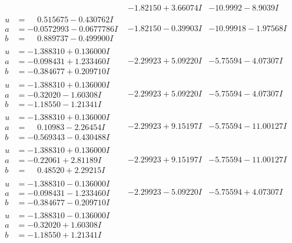 \documentclass[1p]{elsarticle_modified}
\theoremstyle{definition}
\begin{document}
$$\begin{array}{c|c|c}
 & -1.82150 + 3.66074 I & -10.9992 - 8.9039 I \\ \hline\begin{aligned}
u &= \phantom{-}0.515675 - 0.430762 I \\
a &= -0.0572993 - 0.0677786 I \\
b &= \phantom{-}0.889737 - 0.499900 I\end{aligned}
 & -1.82150 - 0.39903 I & -10.99918 - 1.97568 I \\ \hline\begin{aligned}
u &= -1.388310 + 0.136000 I \\
a &= -0.098431 + 1.233460 I \\
b &= -0.384677 + 0.209710 I\end{aligned}
 & -2.29923 + 5.09220 I & -5.75594 - 4.07307 I \\ \hline\begin{aligned}
u &= -1.388310 + 0.136000 I \\
a &= -0.32020 - 1.60308 I \\
b &= -1.18550 - 1.21341 I\end{aligned}
 & -2.29923 + 5.09220 I & -5.75594 - 4.07307 I \\ \hline\begin{aligned}
u &= -1.388310 + 0.136000 I \\
a &= \phantom{-}0.10983 - 2.26454 I \\
b &= -0.569343 - 0.430488 I\end{aligned}
 & -2.29923 + 9.15197 I & -5.75594 - 11.00127 I \\ \hline\begin{aligned}
u &= -1.388310 + 0.136000 I \\
a &= -0.22061 + 2.81189 I \\
b &= \phantom{-}0.48520 + 2.29215 I\end{aligned}
 & -2.29923 + 9.15197 I & -5.75594 - 11.00127 I \\ \hline\begin{aligned}
u &= -1.388310 - 0.136000 I \\
a &= -0.098431 - 1.233460 I \\
b &= -0.384677 - 0.209710 I\end{aligned}
 & -2.29923 - 5.09220 I & -5.75594 + 4.07307 I \\ \hline\begin{aligned}
u &= -1.388310 - 0.136000 I \\
a &= -0.32020 + 1.60308 I \\
b &= -1.18550 + 1.21341 I\end{aligned}

\end{array}$$
\end{document}
